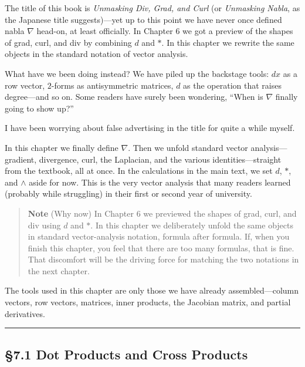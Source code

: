 The title of this book is \emph{Unmasking Div, Grad, and Curl} (or
\emph{Unmasking Nabla}, as the Japanese title suggests)---yet up to this
point we have never once defined nabla \(\nabla\) head-on, at least
officially. In Chapter 6 we got a preview of the shapes of grad, curl,
and div by combining \(d\) and \(\ast\). In this chapter we rewrite the
same objects in the standard notation of vector analysis.

What have we been doing instead? We have piled up the backstage tools:
\(dx\) as a row vector, \(2\)-forms as antisymmetric matrices, \(d\) as
the operation that raises degree---and so on. Some readers have surely
been wondering, ``When is \(\nabla\) finally going to show up?''

I have been worrying about false advertising in the title for quite a
while myself.

In this chapter we finally define \(\nabla\). Then we unfold standard
vector analysis---gradient, divergence, curl, the Laplacian, and the
various identities---straight from the textbook, all at once. In the
calculations in the main text, we set \(d\), \(\ast\), and \(\wedge\)
aside for now. This is the very vector analysis that many readers
learned (probably while struggling) in their first or second year of
university.

\begin{quote}
\textbf{Note} (Why now) In Chapter 6 we previewed the shapes of grad,
curl, and div using \(d\) and \(\ast\). In this chapter we deliberately
unfold the same objects in standard vector-analysis notation, formula
after formula. If, when you finish this chapter, you feel that there are
too many formulas, that is fine. That discomfort will be the driving
force for matching the two notations in the next chapter.
\end{quote}

The tools used in this chapter are only those we have already
assembled---column vectors, row vectors, matrices, inner products, the
Jacobian matrix, and partial derivatives.

\begin{center}\rule{0.5\linewidth}{0.5pt}\end{center}

\hypertarget{dot-products-and-cross-products}{%
\subsection{§7.1 Dot Products and Cross
Products}\label{dot-products-and-cross-products}}

